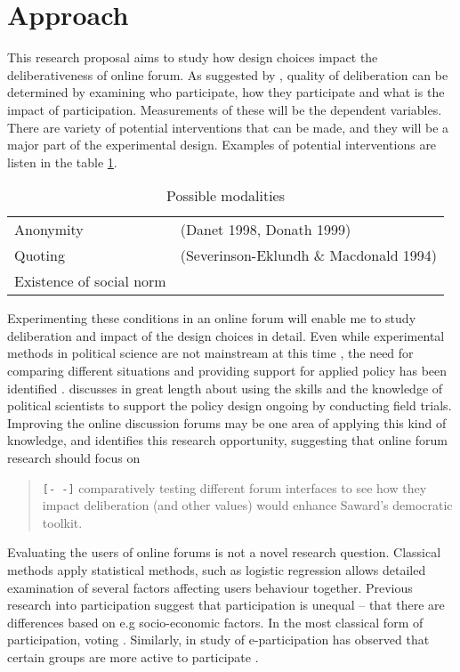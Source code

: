 \documentclass[journal,a4paper]{IEEEtran}
\begin{document}
\section{Approach}
This research proposal aims to study how design choices impact the deliberativeness of online forum. As suggested by , quality of deliberation can be determined by examining who participate, how they participate and what is the impact of participation. Measurements of these will be the dependent variables. There are variety of potential interventions that can be made, and they will be a major part of the experimental design. Examples of potential interventions are listen in the table \ref{tab:modalities}.

\begin{table}
\caption{Possible modalities}
\begin{tabular}{ll}
Anonymity & (Danet 1998, Donath 1999)  \\ 
Quoting & (Severinson-Eklundh \& Macdonald 1994) \\ 
Existence of social norm & \cite{sukumaran11} \\
\end{tabular} 
\label{tab:modalities}
\end{table}

Experimenting these conditions in an online forum will enable me to study deliberation and impact of the design choices in detail. Even while experimental methods in political science are not mainstream at this time \cite{green03,druckman06}, the need for comparing different situations and providing support for applied policy has been identified \cite{stoker10}.  discusses in great length about using the skills and the knowledge of political scientists to support the policy design ongoing by conducting field trials. Improving the online discussion forums may be one area of applying this kind of knowledge, and  identifies this research opportunity, suggesting that online forum research should focus on

\begin{quote}
\texttt{[- -]} comparatively testing different forum interfaces to see how they impact deliberation (and other values) would 
enhance Saward’s democratic toolkit.
\end{quote}

Evaluating the users of online forums is not a novel research question. Classical methods apply statistical methods, such as logistic regression allows detailed examination of several factors affecting users behaviour together. Previous research into participation suggest that participation is unequal -- that there are differences based on e.g socio-economic factors. In the most classical form of participation, voting . Similarly, in study of e-participation has observed that certain groups are more active to participate .
\end{document}
